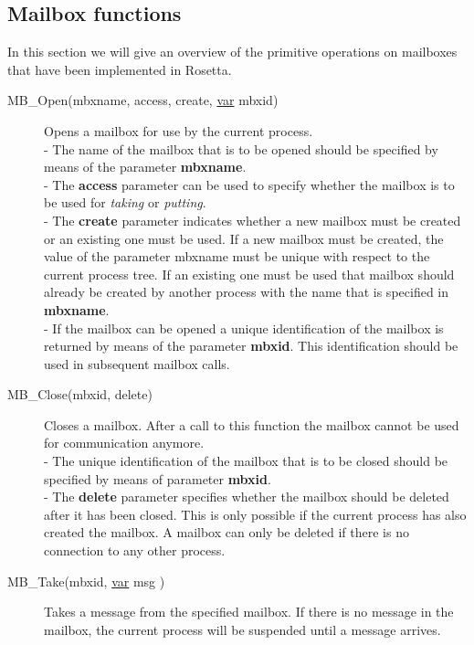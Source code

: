 \subsection{Mailbox functions}
In this section we will give an overview of the primitive operations on 
mailboxes that have been implemented in Rosetta.
\begin{description}
\item[MB\_Open(mbxname, access, create, \underline{var} mbxid)] Opens a mailbox for 
        use by the current process. \\
        - The name of the mailbox that is to be opened should be specified by 
        means of the parameter {\bf mbxname}. \\
        - The {\bf access} parameter can be used to 
        specify whether the mailbox is to be used for {\em taking} or 
        {\em putting}. \\
        - The {\bf create} parameter indicates whether a new mailbox 
        must be created or an existing one must be used. If a new mailbox must 
        be created, the value of the parameter {mbxname} must be unique with
        respect to the current process tree. If an existing one must be used
        that mailbox should already be created by another process with the name
        that is specified in {\bf mbxname}.\\
        - If the mailbox can be 
        opened a unique identification of the mailbox is returned by means of 
        the parameter {\bf mbxid}. This identification should be used in subsequent
        mailbox calls.\\
\item[MB\_Close(mbxid, delete)] Closes a mailbox. After a call to this
        function the mailbox cannot be used for communication anymore.\\
        - The unique identification of the mailbox that is to be closed should
        be specified by means of parameter {\bf mbxid}. \\
        - The {\bf delete} parameter specifies whether the mailbox should be 
        deleted after it has been closed. This is only possible if the current
        process has also created the mailbox. A mailbox can only be deleted if
        there is no connection to any other process.
\item[MB\_Take(mbxid, \underline{var} msg )] Takes a message from the 
        specified mailbox. If there is no message in the mailbox, the current
        process will be suspended until a message arrives. \\

\end{description}
